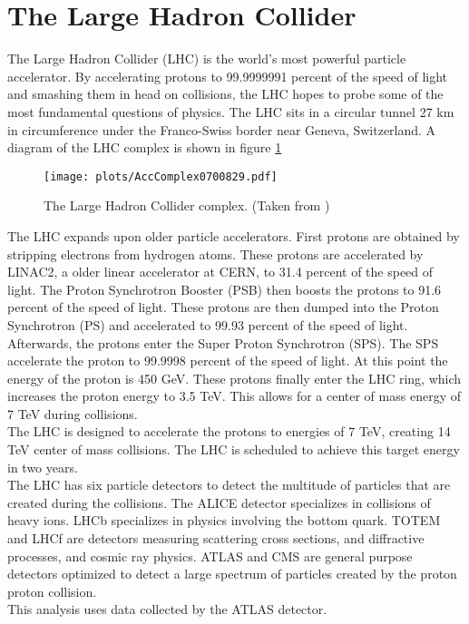 \label{chap:detector}
\section{The Large Hadron Collider}
\indent The Large Hadron Collider (LHC) is the world's most powerful particle accelerator. By accelerating protons to 99.9999991 percent of the speed of light and smashing them in head on collisions, the LHC hopes to probe some of the most fundamental questions of physics. The LHC sits in a circular tunnel 27 km in circumference under the Franco-Swiss border near Geneva, Switzerland. A diagram of the LHC complex is shown in figure \ref{LHC:fig:LHCComplex} ~\\
\begin{figure}[h!]
\centering
\texttt{[image: plots/AccComplex0700829.pdf]}
\caption{ The Large Hadron Collider complex. (Taken from \cite{biblio:LHCpublic}) \label{LHC:fig:LHCComplex}}
\end{figure}

\indent The LHC expands upon older particle accelerators. First protons are obtained by stripping electrons from hydrogen atoms. These protons are accelerated by LINAC2, a older linear accelerator at CERN, to 31.4 percent of the speed of light. The Proton Synchrotron Booster (PSB) then boosts the protons to 91.6 percent of the speed of light. These protons are then dumped into the Proton Synchrotron (PS) and accelerated to 99.93 percent of the speed of light. Afterwards, the protons enter the Super Proton Synchrotron (SPS). The SPS accelerate the proton to 99.9998 percent of the speed of light. At this point the energy of the proton is 450 GeV. These protons finally enter the LHC ring, which increases the proton energy to 3.5 TeV. This allows for a center of mass energy of 7 TeV during collisions. ~\\
\indent The LHC is designed to accelerate the protons to energies of 7 TeV, creating 14 TeV center of mass collisions. The LHC is scheduled to achieve this target energy in two years. ~\\
\indent The LHC has six particle detectors to detect the multitude of particles that are created during the collisions. The ALICE detector specializes in collisions of heavy ions. LHCb specializes in physics involving the bottom quark. TOTEM and LHCf are detectors measuring scattering cross sections, and diffractive processes, and cosmic ray physics. ATLAS and CMS are general purpose detectors optimized to detect a large spectrum of particles created by the proton proton collision. ~\\
\indent This analysis uses data collected by the ATLAS detector. ~\\
